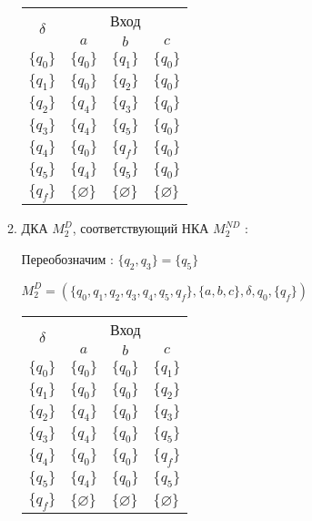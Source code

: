 \begin{enumerate}[label=(\roman{*})]
\begin{enumerate}
		
		\begin{center}
			\begin{tabular}{llll}
				\toprule
				\multicolumn{1}{c}{\multirow{2}{*}{\Large $\delta$}}
				& \multicolumn{3}{c}{Вход} \\
				\cmidrule(rl){2-4}
				& \multicolumn{1}{c}{$a$}
				& \multicolumn{1}{c}{$b$} 
				& \multicolumn{1}{c}{$c$} \\
				\midrule
				$\{q_0\}$       & $\{q_0\}$      		 & $\{q_1\}$     &$\{q_0\}$  \\
				$\{q_1\}$       & $\{q_0\}$    			 & $\{q_2\}$     &$\{q_0\}$ \\
				$\{q_2\}$       & $\{q_4\}$    			 & $\{q_3\}$     &$\{q_0\}$  \\
				$\{q_3\}$       & $\{q_4\}$    			 & $\{q_5\}$     &$\{q_0\}$  \\
				$\{q_4\}$       & $\{q_0\}$    			 & $\{q_f\}$     &$\{q_0\}$  \\
				$\{q_5\}$ 		& $\{q_4\}$    			 & $\{q_5\}$     &$\{q_0\}$  \\
				$\{q_f\}$       & $\{\varnothing\}$    	 & $\{\varnothing\}$     &$\{\varnothing\}$  \\
				\bottomrule
			\end{tabular}
		\end{center}
		
		
		\item ДКА $M^{D}_2$, соответствующий НКА  $M^{ND}_2$ :
		\newline
		
		Переобозначим : $\{q_2, q_3\} = \{q_5\}$ 
		\newline 
		
		$M^{D}_2 = (\{q_0, q_1, q_2, q_3, q_4, q_5, q_f\}, \{a, b, c\}, \delta, q_0, \{q_f\})$
		
			\begin{center}
			\begin{tabular}{llll}
				\toprule
				\multicolumn{1}{c}{\multirow{2}{*}{\Large $\delta$}}
				& \multicolumn{3}{c}{Вход} \\
				\cmidrule(rl){2-4}
				& \multicolumn{1}{c}{$a$}
				& \multicolumn{1}{c}{$b$} 
				& \multicolumn{1}{c}{$c$} \\
				\midrule
				$\{q_0\}$       & $\{q_0\}$      		 & $\{q_0\}$     &$\{q_1\}$  \\
				$\{q_1\}$       & $\{q_0\}$    			 & $\{q_0\}$     &$\{q_2\}$ \\
				$\{q_2\}$       & $\{q_4\}$    			 & $\{q_0\}$     &$\{q_3\}$  \\
				$\{q_3\}$       & $\{q_4\}$    			 & $\{q_0\}$     &$\{q_5\}$  \\
				$\{q_4\}$       & $\{q_0\}$    			 & $\{q_0\}$     &$\{q_f\}$  \\
				$\{q_5\}$       & $\{q_4\}$    			 & $\{q_0\}$     &$\{q_5\}$  \\
				$\{q_f\}$       & $\{\varnothing\}$    	 & $\{\varnothing\}$     &$\{\varnothing\}$  \\
				\bottomrule
			\end{tabular}
		\end{center}
		

\end{enumerate}
\end{enumerate}
